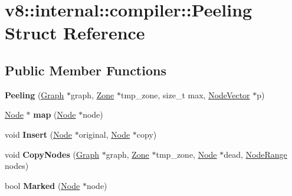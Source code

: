 \hypertarget{structv8_1_1internal_1_1compiler_1_1_peeling}{}\section{v8\+:\+:internal\+:\+:compiler\+:\+:Peeling Struct Reference}
\label{structv8_1_1internal_1_1compiler_1_1_peeling}
\subsection*{Public Member Functions}
\begin{DoxyCompactItemize}
\item 
{\bfseries Peeling} (\hyperlink{classv8_1_1internal_1_1compiler_1_1_graph}{Graph} $\ast$graph, \hyperlink{classv8_1_1internal_1_1_zone}{Zone} $\ast$tmp\+\_\+zone, size\+\_\+t max, \hyperlink{classv8_1_1internal_1_1_zone_vector}{Node\+Vector} $\ast$p)\hypertarget{structv8_1_1internal_1_1compiler_1_1_peeling_af7ffee94ba53582418b231b61ada7f1f}{}\label{structv8_1_1internal_1_1compiler_1_1_peeling_af7ffee94ba53582418b231b61ada7f1f}

\item 
\hyperlink{classv8_1_1internal_1_1compiler_1_1_node}{Node} $\ast$ {\bfseries map} (\hyperlink{classv8_1_1internal_1_1compiler_1_1_node}{Node} $\ast$node)\hypertarget{structv8_1_1internal_1_1compiler_1_1_peeling_aa151de1778d8eb6aa0c3b511f5f3d89c}{}\label{structv8_1_1internal_1_1compiler_1_1_peeling_aa151de1778d8eb6aa0c3b511f5f3d89c}

\item 
void {\bfseries Insert} (\hyperlink{classv8_1_1internal_1_1compiler_1_1_node}{Node} $\ast$original, \hyperlink{classv8_1_1internal_1_1compiler_1_1_node}{Node} $\ast$copy)\hypertarget{structv8_1_1internal_1_1compiler_1_1_peeling_acac7b7d8dbf02394162428357e43f0ae}{}\label{structv8_1_1internal_1_1compiler_1_1_peeling_acac7b7d8dbf02394162428357e43f0ae}

\item 
void {\bfseries Copy\+Nodes} (\hyperlink{classv8_1_1internal_1_1compiler_1_1_graph}{Graph} $\ast$graph, \hyperlink{classv8_1_1internal_1_1_zone}{Zone} $\ast$tmp\+\_\+zone, \hyperlink{classv8_1_1internal_1_1compiler_1_1_node}{Node} $\ast$dead, \hyperlink{classv8_1_1base_1_1iterator__range}{Node\+Range} nodes)\hypertarget{structv8_1_1internal_1_1compiler_1_1_peeling_a14ebc3e581698bd4992efdc1b9216e7c}{}\label{structv8_1_1internal_1_1compiler_1_1_peeling_a14ebc3e581698bd4992efdc1b9216e7c}

\item 
bool {\bfseries Marked} (\hyperlink{classv8_1_1internal_1_1compiler_1_1_node}{Node} $\ast$node)\hypertarget{structv8_1_1internal_1_1compiler_1_1_peeling_aec3fb6c9cc8bfdad6f0c096438f935be}{}\label{structv8_1_1internal_1_1compiler_1_1_peeling_aec3fb6c9cc8bfdad6f0c096438f935be}

\end{DoxyCompactItemize}

